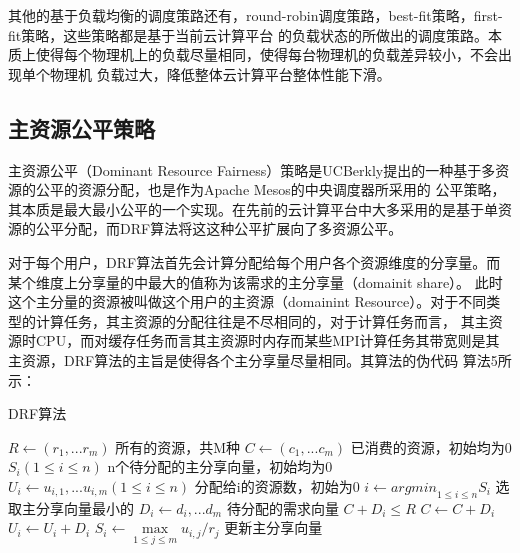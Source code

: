 其他的基于负载均衡的调度策路还有，round-robin调度策路，best-fit策略，first-fit策略，这些策略都是基于当前云计算平台
的负载状态的所做出的调度策路。本质上使得每个物理机上的负载尽量相同，使得每台物理机的负载差异较小，不会出现单个物理机
负载过大，降低整体云计算平台整体性能下滑。

\subsection{主资源公平策略}
主资源公平（Dominant Resource Fairness）策略是UCBerkly提出的一种基于多资源的公平的资源分配，也是作为Apache Mesos的中央调度器所采用的
公平策略，其本质是最大最小公平的一个实现。在先前的云计算平台中大多采用的是基于单资源的公平分配，而DRF算法将这这种公平扩展向了多资源公平。

对于每个用户，DRF算法首先会计算分配给每个用户各个资源维度的分享量。而某个维度上分享量的中最大的值称为该需求的主分享量（domainit share）。
此时这个主分量的资源被叫做这个用户的主资源（domainint Resource）。对于不同类型的计算任务，其主资源的分配往往是不尽相同的，对于计算任务而言，
其主资源时CPU，而对缓存任务而言其主资源时内存而某些MPI计算任务其带宽则是其主资源，DRF算法的主旨是使得各个主分享量尽量相同。其算法的伪代码
算法5所示：
\begin{algorithm} 
\caption {DRF算法} 
\begin{codebox}
\li	$R \leftarrow \left({r}_{1},...{r}_{m} \right)$ \RComment 所有的资源，共M种
\li	$C \leftarrow \left({c}_{1},...{c}_{m}\right)$ \RComment 已消费的资源，初始均为0
\li	${S}_{i} (1 \leq i \leq n)$				\RComment n个待分配的主分享向量，初始均为0
\li	${U}_{i} \leftarrow {{u}_{i,1},...{u}_{i,m}}(1 \leq i \leq n)$	\RComment 分配给i的资源数，初始为0
\li	$i \leftarrow {argmin}_{1 \leq i \leq n} {{S}_{i}}$ \RComment 选取主分享向量最小的
\li	${D}_{i} \leftarrow {{d}_{i},...{d}_{m}}$ \RComment 待分配的需求向量
\li	\If $C + {D}_{i} \leq R$
\li	\Then 
		$C \leftarrow C + D_{i}$                  
\li            	${U}_{i} \leftarrow {U}_{i} + {D}_{i}$ 
\li		${S}_{i} \leftarrow \max \limits_{1 \leq j \leq m} {{{u}_{i,j}}/{r}_{j}}$ \RComment 更新主分享向量
\li	\Else
\li		\Return
	\End
\end{codebox}
\end{algorithm} 


